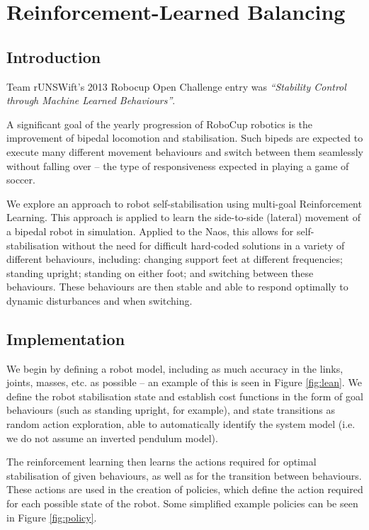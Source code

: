 \chapter{Reinforcement-Learned Balancing}
\label{chap:ns}

\section{Introduction}

Team rUNSWift's 2013 Robocup Open Challenge entry was \textit{``Stability Control through Machine Learned Behaviours''}\cite{openchallenge}.

A significant goal of the yearly progression of RoboCup robotics is the improvement of bipedal locomotion and stabilisation. Such bipeds are expected to execute many different movement behaviours and switch between them seamlessly without falling over -- the type of responsiveness expected in playing a game of soccer. 

We explore an approach to robot self-stabilisation using multi-goal Reinforcement Learning. This approach is applied to learn the side-to-side (lateral) movement of a bipedal robot in simulation. Applied to the Naos, this allows for self-stabilisation without the need for difficult hard-coded solutions in a variety of different behaviours, including: changing support feet at different frequencies; standing upright; standing on either foot; and switching between these behaviours. These behaviours are then stable and able to respond optimally to dynamic disturbances and when switching.


\section{Implementation}
We begin by defining a robot model, including as much accuracy in the links, joints, masses, etc. as possible -- an example of this is seen in Figure \ref{fig:lean}. We define the robot stabilisation state and establish cost functions in the form of goal behaviours (such as standing upright, for example), and state transitions as random action exploration, able to automatically identify the system model (i.e. we do not assume an inverted pendulum model). 

The reinforcement learning then learns the actions required for optimal stabilisation of given behaviours, as well as for the transition between behaviours. These actions are used in the creation of policies, which define the action required for each possible state of the robot. Some simplified example policies can be seen in Figure \ref{fig:policy}.

